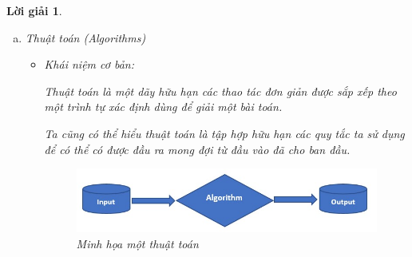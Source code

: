 \documentclass[14pt, a4paper]{article}
\theoremstyle{sltheorem}
\theoremstyle{soltheorem}
\newtheorem*{loigiai}{Lời giải}
\begin{document}
\begin{loigiai}
\begin{enumerate}[a)]
            Input: Đồ thị $G$

            Output: Xác định đường đi $d=(u=v_1, v_2, \dots, v_n=n)$ (với $v_i \in V$, $(v_i, v_{i + 1}) \in E$) có độ dài ngắn nhất
            \item Thuật toán (Algorithms)
            \begin{itemize}
                \item Khái niệm cơ bản:
                
                Thuật toán là một dãy hữu hạn các thao tác đơn giản được sắp xếp theo một trình tự xác định dùng để giải một bài toán.

                Ta cũng có thể hiểu thuật toán là tập hợp hữu hạn các quy tắc ta sử dụng để có thể có được đầu ra mong đợi từ đầu vào đã cho ban đầu.

                \begin{figure}[h!]
                    \centering
                    \includegraphics[scale=0.6]{algorithm.jpg}
                    \caption{Minh họa một thuật toán}
                \end{figure}


\end{itemize}
\end{enumerate}
\end{loigiai}
\end{document}
